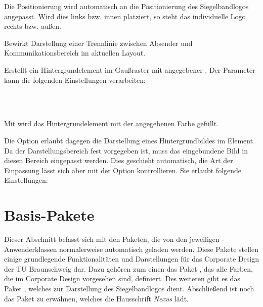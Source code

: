 \documentclass[a4paper,11pt]{tubsreprt}
\newcommand{\CD}{Corporate Design\xspace}
\begin{document}
Die Positionierung wird automatisch an die Positionierung des Siegelbandlogos
angepasst. Wird dies links bzw. innen platziert, so steht das individuelle
Logo rechts bzw. außen.

\begin{Declaration}
\end{Declaration}

Bewirkt Darstellung einer Trennlinie zwischen Absender und Kommunikationsbereich
im aktuellen Layout.

\begin{Declaration}
\end{Declaration}

Erstellt ein Hintergrundelement im Gaußraster mit angegebener .
Der Parameter  kann die folgenden Einstellungen verarbeiten:

\begin{Declaration}
  \\
  \\
\end{Declaration}

Mit  wird das Hintergrundelement mit der angegebenen
Farbe gefüllt.

Die Option  erlaubt dagegen die Darstellung
eines Hintergrundbildes im Element.
Da der Darstellungsbereich fest vorgegeben ist, muss das eingebundene Bild
in diesen Bereich eingepasst werden. Dies geschieht automatisch, die Art
der Einpassung lässt sich aber mit der Option  kontrollieren.
Sie erlaubt folgende Einstellungen:


\begin{desctable}
\end{desctable}

\part{Basis-Pakete}

Dieser Abschnitt befasst sich mit den Paketen, die von den jeweiligen
\tubslatex-Anwenderklassen normalerweise automatisch geladen werden.
Diese Pakete stellen einige grundlegende Funktionalitäten und Darstellungen
für das \CD der TU Braunschweig dar. Dazu gehören zum einen das Paket
, das alle Farben, die im \CD vorgesehen sind,
definiert. Des weiteren gibt es das Paket , welches
zur Darstellung des Siegelbandlogos dient. Abschließend ist noch das Paket
 zu erwähnen, welches die Hausschrift \emph{Nexus}
lädt.
\end{document}
